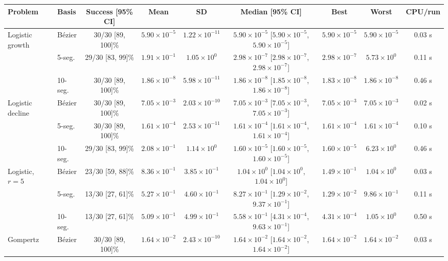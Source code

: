 \begin{tabular}{llccccccc}
\toprule
Problem & Basis & Success [95\% CI] & Mean & SD & Median [95\% CI] & Best & Worst & CPU/run\\
\midrule
Logistic growth & B\'ezier & 30/30 [89, 100]\% & $5.90\times10^{-5}$ & $1.22\times10^{-11}$ & $5.90\times10^{-5}$ [$5.90\times10^{-5}$, $5.90\times10^{-5}$] & $5.90\times10^{-5}$ & $5.90\times10^{-5}$ & 0.03 s\\
 & 5-seg. & 29/30 [83, 99]\% & $1.91\times10^{-1}$ & $1.05\times10^{0}$ & $2.98\times10^{-7}$ [$2.98\times10^{-7}$, $2.98\times10^{-7}$] & $2.98\times10^{-7}$ & $5.73\times10^{0}$ & 0.11 s\\
 & 10-seg. & 30/30 [89, 100]\% & $1.86\times10^{-8}$ & $5.98\times10^{-11}$ & $1.86\times10^{-8}$ [$1.85\times10^{-8}$, $1.86\times10^{-8}$] & $1.83\times10^{-8}$ & $1.86\times10^{-8}$ & 0.46 s\\
\addlinespace
Logistic decline & B\'ezier & 30/30 [89, 100]\% & $7.05\times10^{-3}$ & $2.03\times10^{-10}$ & $7.05\times10^{-3}$ [$7.05\times10^{-3}$, $7.05\times10^{-3}$] & $7.05\times10^{-3}$ & $7.05\times10^{-3}$ & 0.02 s\\
 & 5-seg. & 30/30 [89, 100]\% & $1.61\times10^{-4}$ & $2.53\times10^{-11}$ & $1.61\times10^{-4}$ [$1.61\times10^{-4}$, $1.61\times10^{-4}$] & $1.61\times10^{-4}$ & $1.61\times10^{-4}$ & 0.10 s\\
 & 10-seg. & 29/30 [83, 99]\% & $2.08\times10^{-1}$ & $1.14\times10^{0}$ & $1.60\times10^{-5}$ [$1.60\times10^{-5}$, $1.60\times10^{-5}$] & $1.60\times10^{-5}$ & $6.23\times10^{0}$ & 0.46 s\\
\addlinespace
Logistic, $r=5$ & B\'ezier & 23/30 [59, 88]\% & $8.36\times10^{-1}$ & $3.85\times10^{-1}$ & $1.04\times10^{0}$ [$1.04\times10^{0}$, $1.04\times10^{0}$] & $1.49\times10^{-1}$ & $1.04\times10^{0}$ & 0.03 s\\
 & 5-seg. & 13/30 [27, 61]\% & $5.27\times10^{-1}$ & $4.60\times10^{-1}$ & $8.27\times10^{-1}$ [$1.29\times10^{-2}$, $9.37\times10^{-1}$] & $1.29\times10^{-2}$ & $9.86\times10^{-1}$ & 0.11 s\\
 & 10-seg. & 13/30 [27, 61]\% & $5.09\times10^{-1}$ & $4.99\times10^{-1}$ & $5.58\times10^{-1}$ [$4.31\times10^{-4}$, $9.63\times10^{-1}$] & $4.31\times10^{-4}$ & $1.05\times10^{0}$ & 0.50 s\\
\addlinespace
Gompertz & B\'ezier & 30/30 [89, 100]\% & $1.64\times10^{-2}$ & $2.43\times10^{-10}$ & $1.64\times10^{-2}$ [$1.64\times10^{-2}$, $1.64\times10^{-2}$] & $1.64\times10^{-2}$ & $1.64\times10^{-2}$ & 0.03 s\\

\end{tabular}
